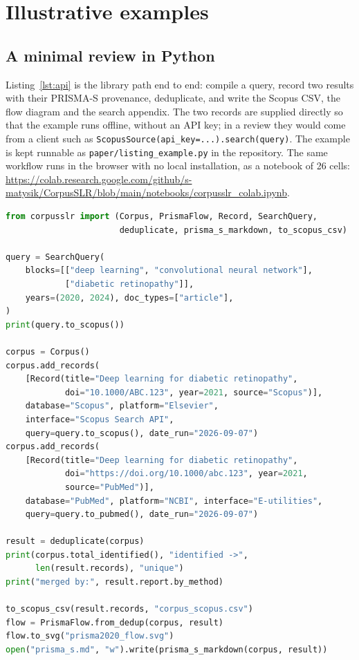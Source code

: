 \documentclass[final,5p,times,twocolumn]{elsarticle}
\begin{document}
\section{Illustrative examples}
\label{sec:examples}

\subsection{A minimal review in Python}

Listing~\ref{lst:api} is the library path end to end: compile a query, record
two results with their PRISMA-S provenance, deduplicate, and write the Scopus
CSV, the flow diagram and the search appendix. The two records are supplied
directly so that the example runs offline, without an API key; in a review
they would come from a client such as
\texttt{ScopusSource(api\_key=...).search(query)}. The example is kept
runnable as \texttt{paper/listing\_example.py} in the repository.
The same workflow runs in the browser with no local installation, as a
notebook of 26 cells:
\url{https://colab.research.google.com/github/s-matysik/CorpusSLR/blob/main/notebooks/corpusslr_colab.ipynb}.

\begin{lstlisting}[language=Python,caption={A complete review in the library
API. Runs offline; the file is executed as part of preparing this
article.},label={lst:api}]
from corpusslr import (Corpus, PrismaFlow, Record, SearchQuery,
                       deduplicate, prisma_s_markdown, to_scopus_csv)

query = SearchQuery(
    blocks=[["deep learning", "convolutional neural network"],
            ["diabetic retinopathy"]],
    years=(2020, 2024), doc_types=["article"],
)
print(query.to_scopus())

corpus = Corpus()
corpus.add_records(
    [Record(title="Deep learning for diabetic retinopathy",
            doi="10.1000/ABC.123", year=2021, source="Scopus")],
    database="Scopus", platform="Elsevier",
    interface="Scopus Search API",
    query=query.to_scopus(), date_run="2026-09-07")
corpus.add_records(
    [Record(title="Deep learning for diabetic retinopathy",
            doi="https://doi.org/10.1000/abc.123", year=2021,
            source="PubMed")],
    database="PubMed", platform="NCBI", interface="E-utilities",
    query=query.to_pubmed(), date_run="2026-09-07")

result = deduplicate(corpus)
print(corpus.total_identified(), "identified ->",
      len(result.records), "unique")
print("merged by:", result.report.by_method)

to_scopus_csv(result.records, "corpus_scopus.csv")
flow = PrismaFlow.from_dedup(corpus, result)
flow.to_svg("prisma2020_flow.svg")
open("prisma_s.md", "w").write(prisma_s_markdown(corpus, result))
\end{lstlisting}
\end{document}
